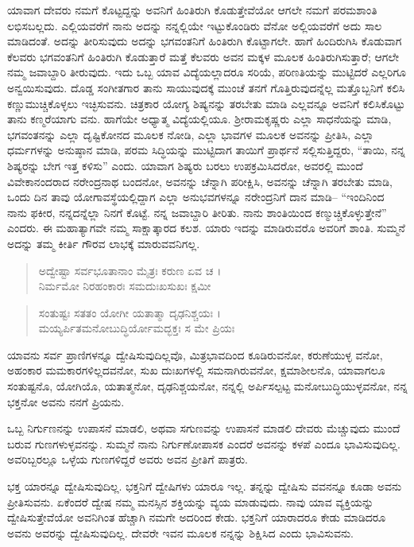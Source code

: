 ಯಾವಾಗ ದೇವರು ನಮಗೆ ಕೊಟ್ಟದ್ದನ್ನು ಅವನಿಗೆ ಹಿಂತಿರುಗಿ ಕೊಡುತ್ತೇವೆಯೋ ಆಗಲೇ ನಮಗೆ ಪರಮಶಾಂತಿ ಲಭಿಸಬಲ್ಲದು. ಎಲ್ಲಿಯವರೆಗೆ ನಾನು ಅದನ್ನು ನನ್ನಲ್ಲಿಯೇ ಇಟ್ಟುಕೊಂಡಿರು ವೆನೋ ಅಲ್ಲಿಯವರೆಗೆ ಅದು ಸಾಲ ಮಾಡಿದಂತೆ. ಅದನ್ನು ತೀರಿಸುವುದು ಅದನ್ನು ಭಗವಂತನಿಗೆ ಹಿಂತಿರುಗಿ ಕೊಟ್ಟಾಗಲೇ. ಹಾಗೆ ಹಿಂದಿರುಗಿಸಿ ಕೊಡುವಾಗ ಕೆಲವರು ಭಗವಂತನಿಗೆ ಹಿಂತಿರುಗಿ ಕೊಡುತ್ತಾರೆ ಮತ್ತೆ ಕೆಲವರು ಅವನ ಮಕ್ಕಳ ಮೂಲಕ ಹಿಂತಿರುಗಿಸುತ್ತಾರೆ; ಆಗಲೇ ನಮ್ಮ ಜವಾಬ್ದಾರಿ ತೀರುವುದು. ಇದು ಒಬ್ಬ ಯಾವ ವಿದ್ಯೆಯಲ್ಲಾದರೂ ಸರಿಯೆ, ಪರಿಣತಿಯನ್ನು ಮುಟ್ಟಿದರೆ ಎಲ್ಲರಿಗೂ ಅನ್ವಯಿಸುವುದು. ದೊಡ್ಡ ಸಂಗೀತಗಾರ ತಾನು ಸಾಯುವುದಕ್ಕೆ ಮುಂಚೆ ತನಗೆ ಗೊತ್ತಿರುವುದನ್ನೆಲ್ಲ ಮತ್ತೊಬ್ಬನಿಗೆ ಕಲಿಸಿ ಕಣ್ಣುಮುಚ್ಚಿಕೊಳ್ಳಲು ಇಚ್ಛಿಸುವನು. ಚಿತ್ರಕಾರ ಯೋಗ್ಯ ಶಿಷ್ಯನನ್ನು ತರಬೇತು ಮಾಡಿ ಎಲ್ಲವನ್ನೂ ಅವನಿಗೆ ಕಲಿಸಿಕೊಟ್ಟು ತಾನು ಕಣ್ಮರೆಯಾಗು ವನು. ಹಾಗೆಯೇ ಅಧ್ಯಾತ್ಮ ವಿದ್ಯೆಯಲ್ಲಿಯೂ. ಶ್ರೀರಾಮಕೃಷ್ಣರು ಎಲ್ಲಾ ಸಾಧನೆಯನ್ನು ಮಾಡಿ, ಭಗವಂತನನ್ನು ಎಲ್ಲಾ ದೃಷ್ಟಿಕೋನದ ಮೂಲಕ ನೋಡಿ, ಎಲ್ಲಾ ಭಾವಗಳ ಮೂಲಕ ಅವನನ್ನು ಪ್ರೀತಿಸಿ, ಎಲ್ಲಾ ಧರ್ಮಗಳನ್ನು ಅನುಷ್ಠಾನ ಮಾಡಿ, ಪರಮ ಸಿದ್ಧಿಯನ್ನು ಮುಟ್ಟಿದಾಗ ತಾಯಿಗೆ ಪ್ರಾರ್ಥನೆ ಸಲ್ಲಿಸುತ್ತಿದ್ದರು, “ತಾಯಿ, ನನ್ನ ಶಿಷ್ಯರನ್ನು ಬೇಗ ಇತ್ತ ಕಳಿಸು” ಎಂದು. ಯಾವಾಗ ಶಿಷ್ಯರು ಬರಲು ಉಪಕ್ರಮಿಸಿದರೋ, ಅವರಲ್ಲಿ ಮುಂದೆ ವಿವೇಕಾನಂದರಾದ ನರೇಂದ್ರನಾಥ ಬಂದನೋ, ಅವನನ್ನು ಚೆನ್ನಾಗಿ ಪರೀಕ್ಷಿಸಿ, ಅವನನ್ನು ಚೆನ್ನಾಗಿ ತರಬೇತು ಮಾಡಿ, ಒಂದು ದಿನ ತಾವು ಯೋಗಾವಸ್ಥೆಯಲ್ಲಿದ್ದಾಗ ಎಲ್ಲಾ ಅನುಭವಗಳನ್ನೂ ನರೇಂದ್ರನಿಗೆ ದಾನ ಮಾಡಿ– “ಇಂದಿನಿಂದ ನಾನು ಫಕೀರ, ನನ್ನದನ್ನೆಲ್ಲಾ ನಿನಗೆ ಕೊಟ್ಟೆ. ನನ್ನ ಜವಾಬ್ದಾರಿ ತೀರಿತು. ನಾನು ಶಾಂತಿಯಿಂದ ಕಣ್ಮುಚ್ಚಿಕೊಳ್ಳುತ್ತೇನೆ” ಎಂದರು. ಈ ಮಹಾತ್ಯಾಗವೇ ನಮ್ಮ ಸಾಕ್ಷಾತ್ಕಾರದ ಕಲಶ. ಯಾರು ಇದನ್ನು ಮಾಡಿರುವರೊ ಅವರಿಗೆ ಶಾಂತಿ. ಸುಮ್ಮನೆ ಅದನ್ನು ತಮ್ಮ ಕೀರ್ತಿ ಗೌರವ ಲಾಭಕ್ಕೆ ಮಾರುವವನಿಗಲ್ಲ.

\begin{verse}
ಅದ್ವೇಷ್ಟಾ ಸರ್ವಭೂತಾನಾಂ ಮೈತ್ರಃ ಕರುಣ ಏವ ಚ ।\\ನಿರ್ಮಮೋ ನಿರಹಂಕಾರಃ ಸಮದುಃಖಸುಖಃ ಕ್ಷಮೀ 
\end{verse}

\begin{verse}
ಸಂತುಷ್ಟಃ ಸತತಂ ಯೋಗೀ ಯತಾತ್ಮಾ ದೃಢನಿಶ್ಚಯಃ ।\\ಮಯ್ಯರ್ಪಿತಮನೋಬುದ್ಧಿರ್ಯೋಮದ್ಭಕ್ತಃ ಸ ಮೇ ಪ್ರಿಯಃ 
\end{verse}

{\small ಯಾವನು ಸರ್ವ ಪ್ರಾಣಿಗಳನ್ನೂ ದ್ವೇಷಿಸುವುದಿಲ್ಲವೊ, ಮಿತ್ರಭಾವದಿಂದ ಕೂಡಿರುವನೋ, ಕರುಣೆಯುಳ್ಳ ವನೋ, ಅಹಂಕಾರ ಮಮಕಾರಗಳಿಲ್ಲದವನೋ, ಸುಖ ದುಃಖಗಳಲ್ಲಿ ಸಮನಾಗಿರುವನೋ, ಕ್ಷಮಾಶೀಲನೊ, ಯಾವಾಗಲೂ ಸಂತುಷ್ಟನೊ, ಯೋಗಿಯೊ, ಯತಾತ್ಮನೋ, ದೃಢನಿಶ್ಚಯನೋ, ನನ್ನಲ್ಲಿ ಅರ್ಪಿಸಲ್ಪಟ್ಟ ಮನೋಬುದ್ಧಿಯುಳ್ಳವನೋ, ನನ್ನ ಭಕ್ತನೋ ಅವನು ನನಗೆ ಪ್ರಿಯನು.}

ಒಬ್ಬ ನಿರ್ಗುಣನನ್ನು ಉಪಾಸನೆ ಮಾಡಲಿ, ಅಥವಾ ಸಗುಣವನ್ನು ಉಪಾಸನೆ ಮಾಡಲಿ ದೇವರು ಮೆಚ್ಚುವುದು ಮುಂದೆ ಬರುವ ಗುಣಗಳುಳ್ಳವನನ್ನು. ಸುಮ್ಮನೆ ನಾನು ನಿರ್ಗುಣೋಪಾಸಕ ಎಂದರೆ ಅವನನ್ನು ಕಳಪೆ ಎಂದೂ ಭಾವಿಸುವುದಿಲ್ಲ. ಅವರಿಬ್ಬರಲ್ಲೂ ಒಳ್ಳೆಯ ಗುಣಗಳಿದ್ದರೆ ಅವರು ಅವನ ಪ್ರೀತಿಗೆ ಪಾತ್ರರು.

ಭಕ್ತ ಯಾರನ್ನೂ ದ್ವೇಷಿಸುವುದಿಲ್ಲ. ಭಕ್ತನಿಗೆ ದ್ವೇಷಿಗಳು ಯಾರೂ ಇಲ್ಲ. ತನ್ನನ್ನು ದ್ವೇಷಿಸು ವವನನ್ನೂ ಕೂಡಾ ಅವನು ಪ್ರೀತಿಸುವನು. ಏಕೆಂದರೆ ದ್ವೇಷ ನಮ್ಮ ಮನಸ್ಸಿನ ಶಕ್ತಿಯನ್ನು ವ್ಯಯ ಮಾಡುವುದು. ನಾವು ಯಾವ ವ್ಯಕ್ತಿಯನ್ನು ದ್ವೇಷಿಸುತ್ತೇವೆಯೋ ಅವನಿಗಿಂತ ಹೆಚ್ಚಾಗಿ ನಮಗೇ ಅದರಿಂದ ಕೇಡು. ಭಕ್ತನಿಗೆ ಯಾರಾದರೂ ಕೇಡು ಮಾಡಿದರೂ ಅವನು ಅವರನ್ನು ದ್ವೇಷಿಸುವುದಿಲ್ಲ. ದೇವರೇ ಇವನ ಮೂಲಕ ನನ್ನನ್ನು ಶಿಕ್ಷಿಸಿದ ಎಂದು ಭಾವಿಸುವನು.

